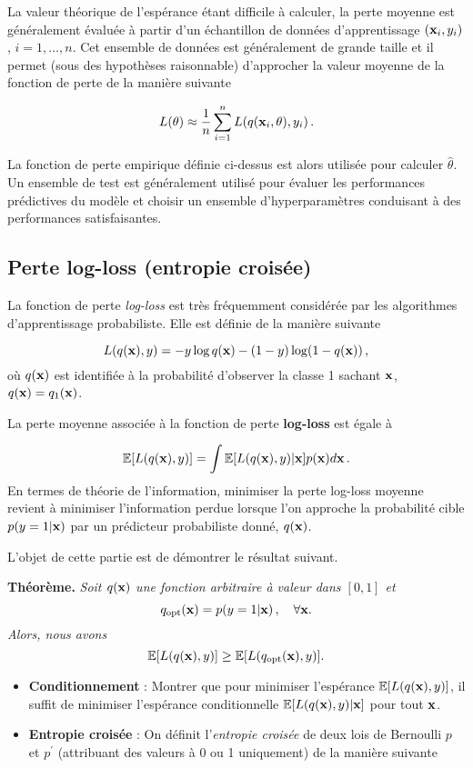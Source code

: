 \documentclass[]{article}
\begin{document}
La valeur théorique de l'espérance étant difficile à calculer, la perte
moyenne est généralement évaluée à partir d'un échantillon de données
d'apprentissage \(({\bf x}_i, y_i)\), \(i = 1, \dots, n\). Cet ensemble
de données est généralement de grande taille et il permet (sous des
hypothèses raisonnable) d'approcher la valeur moyenne de la fonction de
perte de la manière suivante

\[
   L(\theta) \approx \frac1n \sum_{i = 1}^n L(q({\bf x}_i, \theta), y_i) \, .
\]

La fonction de perte empirique définie ci-dessus est alors utilisée pour
calculer \(\hat \theta\). Un ensemble de test est généralement utilisé
pour évaluer les performances prédictives du modèle et choisir un
ensemble d'hyperparamètres conduisant à des performances satisfaisantes.

\subsection{Perte log-loss (entropie
croisée)}\label{perte-log-loss-entropie-croisee}

La fonction de perte \emph{log-loss} est très fréquemment considérée par
les algorithmes d'apprentissage probabiliste. Elle est définie de la
manière suivante

\[
L(q({\bf x}), y) = - y \log q({\bf x}) - (1-y)\log (1 - q({\bf x})) \, ,
\] où \(q({\bf x})\) est identifiée à la probabilité d'observer la
classe 1 sachant \({\bf x}\), \(q({\bf x}) = q_1({\bf x})\).

La perte moyenne associée à la fonction de perte \textbf{log-loss} est
égale à

\[
\mathbb{E}[L(q({\bf x}), y )] =  \int \mathbb{E}[L(q({\bf x}), y) | {\bf x}] p({\bf x}) d{\bf x} \, .
\] En termes de théorie de l'information, minimiser la perte log-loss
moyenne revient à minimiser l'information perdue lorsque l'on approche
la probabilité cible \(p(y = 1|{\bf x})\) par un prédicteur probabiliste
donné, \(q({\bf x})\).

L'objet de cette partie est de démontrer le résultat suivant.

\textbf{Théorème.} \emph{Soit \(q({\bf x})\) une fonction arbitraire à
valeur dans \([0,1]\) et} \[
q_{\rm opt}({\bf x}) = p(y = 1|{\bf x}) \, , \quad \forall {\bf x}.
\] \emph{Alors, nous avons} \[
\mathbb{E}[L(q({\bf x}), y )] \geq \mathbb{E}[L(q_{\rm opt}({\bf x}), y )] .
\]

\begin{itemize}
\item
  \textbf{Conditionnement} : Montrer que pour minimiser l'espérance
  \(\mathbb{E}[L(q({\bf x}), y )]\), il suffit de minimiser l'espérance
  conditionnelle \(\mathbb{E}[L(q({\bf x}), y ) | {\bf x}]\) pour tout
  \({\bf x}\).
\item
  \textbf{Entropie croisée} : On définit l'\emph{entropie croisée} de
  deux lois de Bernoulli \(p\) et \(p^\prime\) (attribuant des valeurs à
  0 ou 1 uniquement) de la manière suivante
\end{itemize}
\end{document}
